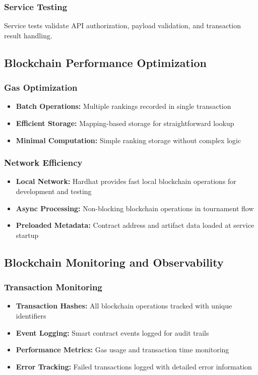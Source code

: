 \documentclass[11pt,a4paper]{report}
\begin{document}
\subsubsection{Service Testing}
Service tests validate API authorization, payload validation, and transaction result handling.

\subsection{Blockchain Performance Optimization}

\subsubsection{Gas Optimization}
\begin{itemize}
  \item \textbf{Batch Operations:} Multiple rankings recorded in single transaction
  \item \textbf{Efficient Storage:} Mapping-based storage for straightforward lookup
  \item \textbf{Minimal Computation:} Simple ranking storage without complex logic
\end{itemize}

\subsubsection{Network Efficiency}
\begin{itemize}
  \item \textbf{Local Network:} Hardhat provides fast local blockchain operations for development and testing
  \item \textbf{Async Processing:} Non-blocking blockchain operations in tournament flow
  \item \textbf{Preloaded Metadata:} Contract address and artifact data loaded at service startup
\end{itemize}

\subsection{Blockchain Monitoring and Observability}

\subsubsection{Transaction Monitoring}
\begin{itemize}
  \item \textbf{Transaction Hashes:} All blockchain operations tracked with unique identifiers
  \item \textbf{Event Logging:} Smart contract events logged for audit trails
  \item \textbf{Performance Metrics:} Gas usage and transaction time monitoring
  \item \textbf{Error Tracking:} Failed transactions logged with detailed error information
\end{itemize}
\end{document}
